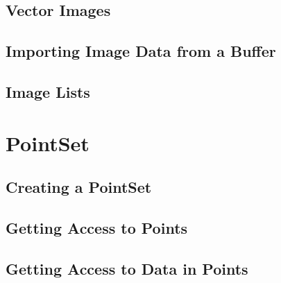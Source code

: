 \label{sec:DefiningRGBImages}



\subsection{Vector Images}
\label{sec:DefiningVectorImages}




\subsection{Importing Image Data from a Buffer}
\label{sec:ImportingImageDataFromABuffer}


\subsection{Image Lists}
\label{sec:ImageLists}




\section{PointSet}
\label{sec:PointSetSection}

\subsection{Creating a PointSet}
\label{sec:CreatingAPointSet}





\subsection{Getting Access to Points}
\label{sec:GettingAccessToPointsInThePointSet}





\subsection{Getting Access to Data in Points}
\label{sec:GettingAccessToDataInThePointSet}






